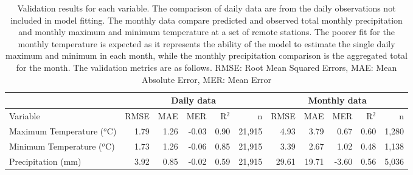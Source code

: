 \documentclass[12pt]{article}
\begin{document}
\begin{table}[ht]
\begin{center}
\begin{footnotesize}
\begin{tabular}{lrrrrr|rrrrr}
  \hline & \multicolumn{5}{c|}{Daily data} & \multicolumn{5}{c}{Monthly data} \\ \hline
Variable & RMSE & MAE & MER & R$^2$ & n  & RMSE & MAE & MER & R$^2$ & n \\ 
  \hline
Maximum Temperature ($^o$C) & 1.79 & 1.26 & -0.03 & 0.90 & 21,915 & 4.93 & 3.79 & 0.67 & 0.60 &1,280\\ 
  Minimum Temperature  ($^o$C) & 1.73 & 1.26 & -0.06 & 0.85 & 21,915 &
  3.39 & 2.67 & 1.02 & 0.48 & 1,138 \\ 
  Precipitation (mm) & 3.92 & 0.85 & -0.02 & 0.59 & 21,915 & 29.61 &
  19.71 & -3.60 & 0.56 & 5,036\\ 
   \hline
\end{tabular}
\end{footnotesize}
\caption{Validation results for each variable.  The comparison of daily data are from the daily observations not included in model fitting. The monthly data compare predicted and observed total monthly precipitation and monthly maximum and minimum temperature at a set of remote stations.  The poorer fit for the monthly temperature is expected as it represents the ability of the model to estimate the single daily maximum and minimum in each month, while the monthly precipitation comparison is the aggregated total for the month. The validation metrics are as follows. RMSE: Root Mean Squared Errors, MAE: Mean Absolute Error, MER: Mean Error}
\label{tab:valid}
\end{center}
\end{table}
\end{document}

